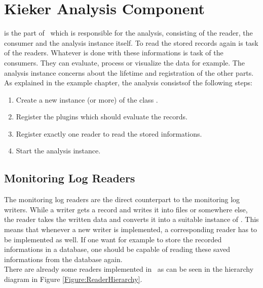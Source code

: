 \chapter{Kieker Analysis Component}
	
	\class{\KiekerAnalysisPart} is the part of \Kieker\  which is responsible for the analysis, consisting of the reader, the consumer and the analysis instance itself. To read the stored records again is task of the readers. Whatever is done with these informations is task of the consumers. They can evaluate, process or visualize the data for example. The analysis instance concerns about the lifetime and registration of the other parts. As explained in the example chapter, the analysis consists\notify  of the following steps:
	\begin{enumerate}
		\item Create a new instance (or more) of the class .
		\item Register the plugins which should evaluate the records.
		\item Register exactly one reader to read the stored informations.
		\item Start the analysis instance.
	\end{enumerate}

	\section{Monitoring Log Readers}

		The monitoring log readers are the direct counterpart to the monitoring log writers. While a writer gets a record and writes it into files or somewhere else, the reader takes the written data and converts it into a suitable instance of . \warning This means that whenever a new writer is implemented, a corresponding reader has to be implemented as well. If one want for example to store the recorded informations in a database, one should be capable of reading these saved informations from the database again.\\
		There are already some readers implemented in \Kieker\  as can be seen in the hierarchy diagram in Figure \ref{Figure:ReaderHierarchy}.

